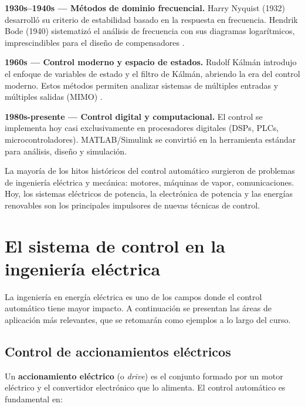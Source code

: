 \textbf{1930s--1940s — Métodos de dominio frecuencial.}
Harry Nyquist (1932) desarrolló su criterio de estabilidad basado en la
respuesta en frecuencia. Hendrik Bode (1940) sistematizó el análisis de
frecuencia con sus diagramas logarítmicos, imprescindibles para el diseño
de compensadores .

\textbf{1960s — Control moderno y espacio de estados.}
Rudolf Kálmán introdujo el enfoque de variables de estado y el filtro de
Kálmán, abriendo la era del control moderno. Estos métodos permiten analizar
sistemas de múltiples entradas y múltiples salidas (MIMO) .

\textbf{1980s-presente — Control digital y computacional.}
El control se implementa hoy casi exclusivamente en procesadores digitales
(DSPs, PLCs, microcontroladores). MATLAB/Simulink se convirtió en la
herramienta estándar para análisis, diseño y simulación.

\begin{observacion}
  La mayoría de los hitos históricos del control automático surgieron de
  problemas de ingeniería eléctrica y mecánica: motores, máquinas de vapor,
  comunicaciones. Hoy, los sistemas eléctricos de potencia, la electrónica de
  potencia y las energías renovables son los principales impulsores de nuevas
  técnicas de control.
\end{observacion}

\section{El sistema de control en la ingeniería eléctrica}
\label{sec:intro-aplicaciones-ee}

La ingeniería en energía eléctrica es uno de los campos donde el control
automático tiene mayor impacto. A continuación se presentan las áreas de
aplicación más relevantes, que se retomarán como ejemplos a lo largo del curso.

\subsection{Control de accionamientos eléctricos}

Un \textbf{accionamiento eléctrico} (o \textit{drive}) es el conjunto formado
por un motor eléctrico y el convertidor electrónico que lo alimenta.
El control automático es fundamental en:

